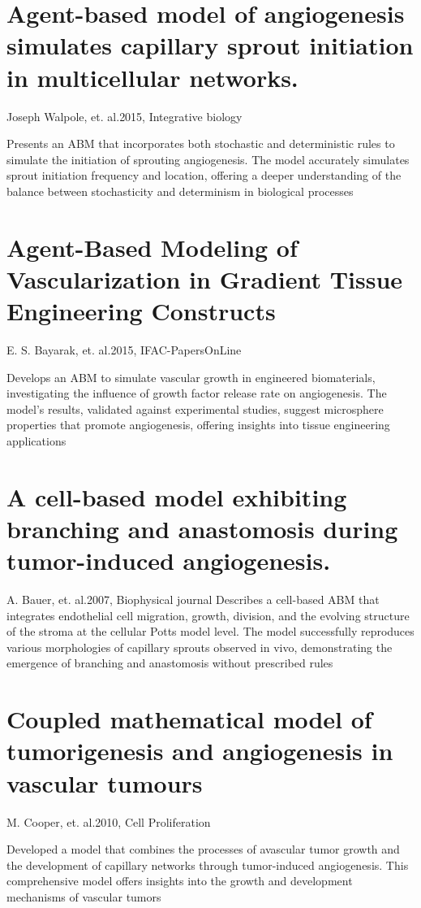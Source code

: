 \section{Agent-based model of angiogenesis simulates capillary sprout initiation in multicellular networks.}{Joseph Walpole, et. al.}{2015, Integrative biology}

Presents an ABM that incorporates both stochastic and deterministic rules to simulate the initiation of sprouting angiogenesis. The model accurately simulates sprout initiation frequency and location, offering a deeper understanding of the balance between stochasticity and determinism in biological processes \cite{Walpole2015}


\section{Agent-Based Modeling of Vascularization in Gradient Tissue Engineering Constructs}{E. S. Bayarak, et. al.}{2015, IFAC-PapersOnLine}

Develops an ABM to simulate vascular growth in engineered biomaterials, investigating the influence of growth factor release rate on angiogenesis. The model's results, validated against experimental studies, suggest microsphere properties that promote angiogenesis, offering insights into tissue engineering applications \cite{Bayrak2015}

\section{A cell-based model exhibiting branching and anastomosis during tumor-induced angiogenesis.}{A. Bauer, et. al.}{2007, Biophysical journal}
Describes a cell-based ABM that integrates endothelial cell migration, growth, division, and the evolving structure of the stroma at the cellular Potts model level. The model successfully reproduces various morphologies of capillary sprouts observed in vivo, demonstrating the emergence of branching and anastomosis without prescribed rules \cite{Bauer2007a}


\section{Coupled mathematical model of tumorigenesis and angiogenesis in vascular tumours}{M. Cooper, et. al.}{2010, Cell Proliferation}

Developed a model that combines the processes of avascular tumor growth and the development of capillary networks through tumor-induced angiogenesis. This comprehensive model offers insights into the growth and development mechanisms of vascular tumors \cite{Cooper2010}

